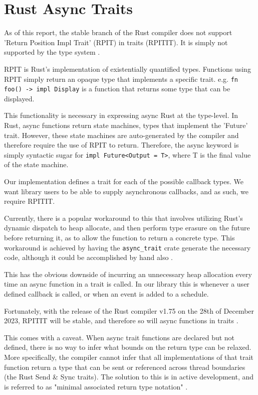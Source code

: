 \section{Rust Async Traits}
As of this report, the stable branch of the Rust compiler does not support 'Return Position Impl Trait' (RPIT) in traits (RPITIT). It is simply not supported by the type system \cite{rustRPITIT}.

RPIT is Rust's implementation of existentially quantified types. Functions using RPIT simply return an opaque type that implements a specific trait. e.g. \texttt{fn foo() -> impl Display} is a function that returns some type that can be displayed.

This functionality is necessary in expressing async Rust at the type-level. In Rust, async functions return state machines, types that implement the 'Future' trait. However, these state machines are auto-generated by the compiler and therefore require the use of RPIT to return. Therefore, the async keyword is simply syntactic sugar for \texttt{impl Future<Output = T>}, where T is the final value of the state machine.

Our implementation defines a trait for each of the possible callback types. We want library users to be able to supply asynchronous callbacks, and as such, we require RPITIT.

Currently, there is a popular workaround to this that involves utilizing Rust's dynamic dispatch to heap allocate, and then perform type erasure on the future before returning it, as to allow the function to return a concrete type. This workaround is achieved by having the \texttt{async\_trait} crate generate the necessary code, although it could be accomplished by hand also \cite{asynctrait}. 

This has the obvious downside of incurring an unnecessary heap allocation every time an async function in a trait is called. In our library this is whenever a user defined callback is called, or when an event is added to a schedule.

Fortunately, with the release of the Rust compiler v1.75 on the 28th of December 2023, RPITIT will be stable, and therefore so will async functions in traits \cite{rust175}. 

This comes with a caveat. When async trait functions are declared but not defined, there is no way to infer what bounds on the return type can be relaxed. More specifically, the compiler cannot infer that all implementations of that trait function return a type that can be sent or referenced across thread boundaries (the Rust Send \& Sync traits). The solution to this is in active development, and is referred to as "minimal associated return type notation" \cite{sendboundproblem}.


